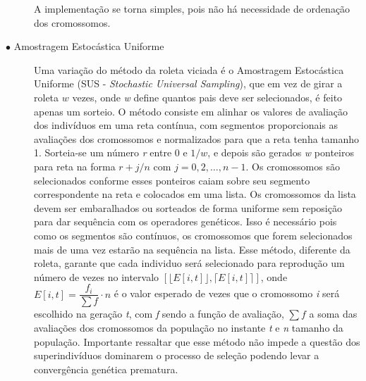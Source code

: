 \begin{description}
A implementação se torna simples, pois não há necessidade de ordenação dos cromossomos. 

%

\item[$\bullet$ Amostragem Estocástica Uniforme] \text{}

Uma variação do método da roleta viciada é o Amostragem Estocástica Uniforme (SUS - \textit{Stochastic Universal Sampling}), que em vez de girar a roleta \(w\) vezes, onde \textit{w} define quantos pais deve ser selecionados, é feito apenas um sorteio. O método consiste em alinhar os valores de avaliação dos indivíduos em uma reta contínua, com segmentos proporcionais as avaliações dos cromossomos e normalizados para que a reta tenha tamanho 1. Sorteia-se um número \textit{r} entre 0 e \(1/w\), e depois são gerados \textit{w} ponteiros para reta na forma \(r + j/n \) com \(j = 0, 2, \dots, n-1 \). Os cromossomos são selecionados conforme esses ponteiros caiam sobre seu segmento correspondente na reta e colocados em uma lista. Os cromossomos da lista devem ser embaralhados ou sorteados de forma uniforme sem reposição para dar sequência com os operadores genéticos. Isso é necessário pois como os segmentos são contínuos, os cromossomos que forem selecionados mais de uma vez estarão na sequência na lista. Esse método, diferente da roleta, garante que cada individuo será selecionado para reprodução um número de vezes no intervalo \(\left[ \lfloor E[i,t] \rfloor , \lceil E[i,t] \rceil \right] \), onde \(E[i,t] = \dfrac{f_i}{\sum f} \cdot n\) é o valor esperado de vezes que o cromossomo \textit{i} será escolhido na geração \textit{t}, com \textit{f} sendo a função de avaliação, \(\sum f\) a soma das avaliações dos cromossomos da população no instante \textit{t} e \textit{n} tamanho da população. Importante ressaltar que esse método não impede a questão dos superindivíduos dominarem o processo de seleção podendo levar a convergência genética prematura. 


\end{description}
